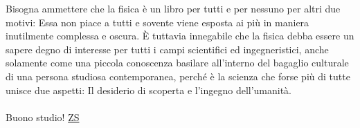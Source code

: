 Bisogna ammettere che la fisica è un libro per tutti e per nessuno per altri due motivi:
Essa non piace a tutti e sovente viene esposta ai più in maniera inutilmente complessa e oscura.
È tuttavia innegabile che la fisica debba essere un sapere degno di interesse per tutti
i campi scientifici ed ingegneristici, anche solamente come una piccola conoscenza
basilare all'interno del bagaglio culturale di una persona studiosa
contemporanea, perché è la scienza che forse più di tutte unisce due aspetti: Il desiderio di
scoperta e l'ingegno dell'umanità.
\\\\
Buono studio! \hfill \href{https://github.com/zenosalty/courses-phy}{ZS \faGithub}